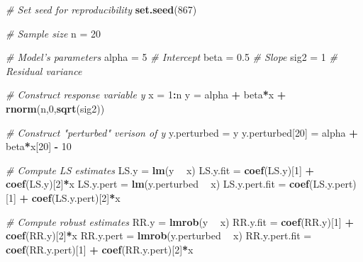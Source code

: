 \documentclass[]{book}
\newenvironment{Shaded}{\begin{snugshade}}{\end{snugshade}}
\newcommand{\KeywordTok}[1]{\textcolor[rgb]{0.13,0.29,0.53}{\textbf{#1}}}
\newcommand{\DecValTok}[1]{\textcolor[rgb]{0.00,0.00,0.81}{#1}}
\newcommand{\FloatTok}[1]{\textcolor[rgb]{0.00,0.00,0.81}{#1}}
\newcommand{\StringTok}[1]{\textcolor[rgb]{0.31,0.60,0.02}{#1}}
\newcommand{\CommentTok}[1]{\textcolor[rgb]{0.56,0.35,0.01}{\textit{#1}}}
\newcommand{\OperatorTok}[1]{\textcolor[rgb]{0.81,0.36,0.00}{\textbf{#1}}}
\newcommand{\NormalTok}[1]{#1}
\theoremstyle{definition}
\theoremstyle{definition}
\theoremstyle{definition}
\theoremstyle{remark}
\begin{document}
\begin{Shaded}
\begin{Highlighting}[]
\CommentTok{# Set seed for reproducibility}
\KeywordTok{set.seed}\NormalTok{(}\DecValTok{867}\NormalTok{)}

\CommentTok{# Sample size}
\NormalTok{n =}\StringTok{ }\DecValTok{20}      

\CommentTok{# Model's parameters}
\NormalTok{alpha =}\StringTok{ }\DecValTok{5}    \CommentTok{# Intercept }
\NormalTok{beta =}\StringTok{ }\FloatTok{0.5}   \CommentTok{# Slope }
\NormalTok{sig2 =}\StringTok{ }\DecValTok{1}     \CommentTok{# Residual variance}

\CommentTok{# Construct response variable y}
\NormalTok{x =}\StringTok{ }\DecValTok{1}\OperatorTok{:}\NormalTok{n }
\NormalTok{y =}\StringTok{ }\NormalTok{alpha }\OperatorTok{+}\StringTok{ }\NormalTok{beta}\OperatorTok{*}\NormalTok{x }\OperatorTok{+}\StringTok{ }\KeywordTok{rnorm}\NormalTok{(n,}\DecValTok{0}\NormalTok{,}\KeywordTok{sqrt}\NormalTok{(sig2))}

\CommentTok{# Construct "perturbed" verison of y}
\NormalTok{y.perturbed =}\StringTok{ }\NormalTok{y}
\NormalTok{y.perturbed[}\DecValTok{20}\NormalTok{] =}\StringTok{ }\NormalTok{alpha }\OperatorTok{+}\StringTok{ }\NormalTok{beta}\OperatorTok{*}\NormalTok{x[}\DecValTok{20}\NormalTok{] }\OperatorTok{-}\StringTok{ }\DecValTok{10}

\CommentTok{# Compute LS estimates}
\NormalTok{LS.y =}\StringTok{ }\KeywordTok{lm}\NormalTok{(y }\OperatorTok{~}\StringTok{ }\NormalTok{x)}
\NormalTok{LS.y.fit =}\StringTok{ }\KeywordTok{coef}\NormalTok{(LS.y)[}\DecValTok{1}\NormalTok{] }\OperatorTok{+}\StringTok{ }\KeywordTok{coef}\NormalTok{(LS.y)[}\DecValTok{2}\NormalTok{]}\OperatorTok{*}\NormalTok{x}
\NormalTok{LS.y.pert =}\StringTok{ }\KeywordTok{lm}\NormalTok{(y.perturbed }\OperatorTok{~}\StringTok{ }\NormalTok{x)}
\NormalTok{LS.y.pert.fit =}\StringTok{ }\KeywordTok{coef}\NormalTok{(LS.y.pert)[}\DecValTok{1}\NormalTok{] }\OperatorTok{+}\StringTok{ }\KeywordTok{coef}\NormalTok{(LS.y.pert)[}\DecValTok{2}\NormalTok{]}\OperatorTok{*}\NormalTok{x}

\CommentTok{# Compute robust estimates}
\NormalTok{RR.y =}\StringTok{ }\KeywordTok{lmrob}\NormalTok{(y }\OperatorTok{~}\StringTok{ }\NormalTok{x)}
\NormalTok{RR.y.fit =}\StringTok{ }\KeywordTok{coef}\NormalTok{(RR.y)[}\DecValTok{1}\NormalTok{] }\OperatorTok{+}\StringTok{ }\KeywordTok{coef}\NormalTok{(RR.y)[}\DecValTok{2}\NormalTok{]}\OperatorTok{*}\NormalTok{x}
\NormalTok{RR.y.pert =}\StringTok{ }\KeywordTok{lmrob}\NormalTok{(y.perturbed }\OperatorTok{~}\StringTok{ }\NormalTok{x)}
\NormalTok{RR.y.pert.fit =}\StringTok{ }\KeywordTok{coef}\NormalTok{(RR.y.pert)[}\DecValTok{1}\NormalTok{] }\OperatorTok{+}\StringTok{ }\KeywordTok{coef}\NormalTok{(RR.y.pert)[}\DecValTok{2}\NormalTok{]}\OperatorTok{*}\NormalTok{x}


\end{Highlighting}
\end{Shaded}
\end{document}

